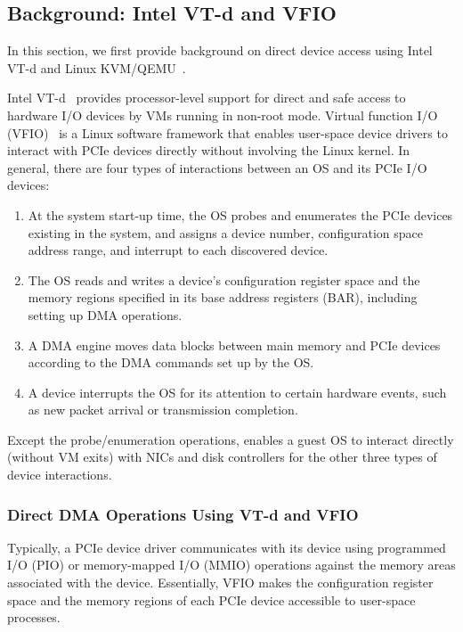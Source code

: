 \subsection{Background: Intel VT-d and VFIO}
In this section, we first  provide background on direct device access using
Intel VT-d and Linux KVM/QEMU~\cite{kvm}.


Intel VT-d~\cite{intelvtd-paper} provides processor-level support for direct
and safe access to hardware I/O devices by VMs running in non-root mode.
Virtual function I/O (VFIO)~\cite{vfio} is a Linux software framework that enables user-space
device drivers to interact with PCIe devices directly without involving the Linux kernel.
In general, there are four types of interactions between an OS and its PCIe I/O devices:
\begin{enumerate}
\parskip 0mm
\itemsep 0mm
\item At the system start-up time, the OS probes and enumerates the PCIe devices existing in the system, and assigns a device number, configuration space address range, and interrupt to each discovered device.

\item The OS reads and writes a device's configuration register space and the memory regions specified in its base address registers (BAR), including setting up DMA operations.

\item A DMA engine moves data blocks between main memory and PCIe devices according to the DMA commands set up by the OS.

\item A device interrupts the OS for its attention to certain hardware events, such as new packet arrival or transmission completion.

\end{enumerate}
Except the probe/enumeration operations,
\na enables a guest OS to interact directly (without VM exits) with NICs and disk controllers
for the other three types of device interactions.

\subsubsection{Direct DMA Operations Using VT-d and VFIO}
Typically, a PCIe device driver communicates with its device using programmed I/O (PIO) or
memory-mapped I/O (MMIO) operations against the memory areas associated with the device.
Essentially, VFIO makes the configuration register space and the memory regions of
each PCIe device accessible to user-space processes.


